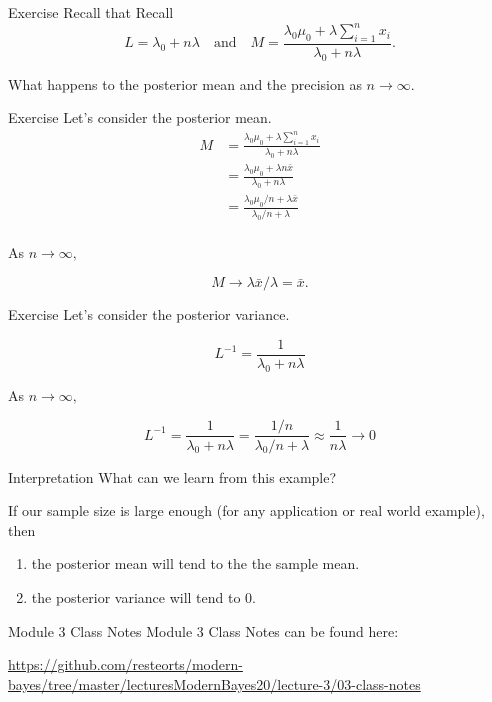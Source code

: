 \documentclass[
  ignorenonframetext,
]{beamer}
\begin{document}
\begin{frame}{Exercise}
\protect\hypertarget{exercise}{}
Recall that Recall \[L =\lambda_0+ n\lambda \quad \text{and} \quad
M =\frac{\lambda_0\mu_0+\lambda\sum_{i = 1}^n x_i}{\lambda_0+ n\lambda}.\]

What happens to the posterior mean and the precision as
\(n \rightarrow \infty.\)
\end{frame}

\begin{frame}{Exercise}
\protect\hypertarget{exercise-1}{}
Let's consider the posterior mean. \[
\begin{aligned}
M &=\frac{\lambda_0\mu_0+\lambda\sum_{i = 1}^n x_i}{\lambda_0+ n\lambda} \\
&=\frac{\lambda_0\mu_0+\lambda n \bar{x}}{\lambda_0+ n\lambda} \\
&=\frac{\lambda_0\mu_0/n+\lambda  \bar{x}}{\lambda_0/n+ \lambda} \\
\end{aligned}
\]

As \(n \rightarrow \infty,\)

\[M \rightarrow \lambda  \bar{x}/\lambda = \bar{x}.\]
\end{frame}

\begin{frame}{Exercise}
\protect\hypertarget{exercise-2}{}
Let's consider the posterior variance.

\[L^{-1} =\frac{1}{\lambda_0+ n\lambda}\]

As \(n \rightarrow \infty,\)

\[L^{-1} = \frac{1}{\lambda_0+ n\lambda} = \frac{1/n}{\lambda_0/n+ \lambda} \approx \frac{1}{n \lambda} \rightarrow 0 \]
\end{frame}

\begin{frame}{Interpretation}
\protect\hypertarget{interpretation}{}
What can we learn from this example?

If our sample size is large enough (for any application or real world
example), then

\begin{enumerate}
\item the posterior mean will tend to the the sample mean.
\item the posterior variance will tend to 0. 
\end{enumerate}
\end{frame}

\begin{frame}{Module 3 Class Notes}
\protect\hypertarget{module-3-class-notes}{}
Module 3 Class Notes can be found here:

\url{https://github.com/resteorts/modern-bayes/tree/master/lecturesModernBayes20/lecture-3/03-class-notes}
\end{frame}
\end{document}

